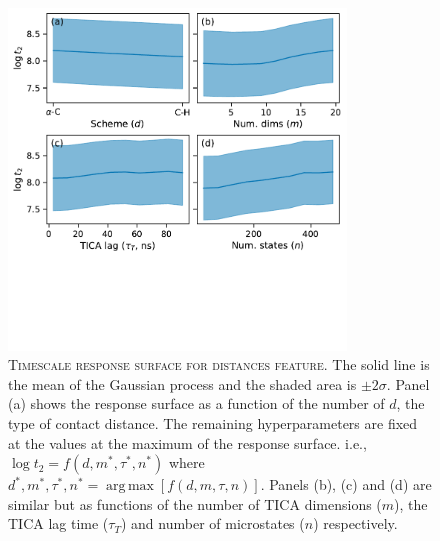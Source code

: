 \documentclass{article}
\DeclareMathOperator*{\argmax}{arg\,max}
\begin{document}
\begin{figure}
    \centering
    \includegraphics[width=0.8\textwidth, trim={0, 4cm, 0, 0}, clip]{figures/response_surface_marginal_distances_linear_ts.pdf}
    
    \caption{\textsc{Timescale response surface for distances feature}. The solid line is the mean of the Gaussian process and the shaded area is $\pm 2\sigma$. Panel (a) shows the response surface as a function of the number of $d$, the type of contact distance. The remaining hyperparameters are fixed at the values at the maximum of the response surface. i.e., $\log{t_2}=f(d, m^{*}, \tau^{*}, n^{*})$ where $d^{*}, m^{*}, \tau^{*}, n^{*} = \argmax \left [f(d,  m, \tau,n)\right]$. Panels (b), (c) and (d) are similar but as functions of the number of TICA dimensions ($m$), the TICA lag time ($\tau_{T}$) and number of microstates ($n$) respectively.}
    \label{fig:repsonse_dist}
\end{figure}
\end{document}
